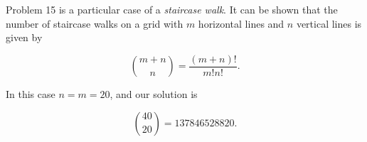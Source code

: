 \documentclass{article}
\begin{document}
Problem 15 is a particular case of a \emph{staircase walk}. It can be shown that the number of staircase walks on a grid with $m$ horizontal lines and $n$ vertical lines is given by

\[ \binom{m + n}{n} = \frac{(m+n)!}{m!n!}.\]

In this case $n = m = 20$, and our solution is

\[ \binom{40}{20} = 137846528820. \]
\end{document}
